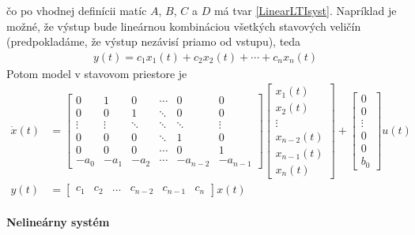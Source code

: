\documentclass[a4paper, 10pt, ]{article}
\begin{document}
čo po vhodnej definícii matíc $A$, $B$, $C$ a $D$ má tvar \eqref{LinearLTIsyst}. Napríklad je možné, že výstup bude lineárnou kombináciou všetkých stavových veličín (predpokladáme, že výstup nezávisí priamo od vstupu), teda
\begin{align}
	y(t) = c_1 x_1(t) + c_2 x_2(t) + \cdots + c_n x_n(t)
\end{align}
Potom model v stavovom priestore je
\begin{subequations}
\begin{align}
	\dot{x}(t)
	&
	=
	\begin{bmatrix}
  	0      & 1      & 0      & \cdots & 0      & 0      \\
   	0      & 0      & 1      & \ddots & 0      & 0      \\
    \vdots & \vdots & \ddots & \ddots & \ddots & \vdots \\
    0      & 0      & 0      & \ddots & 1      & 0      \\
    0      & 0      & 0      & \cdots & 0      & 1      \\
   	-a_0   & -a_1   & -a_2   & \cdots &-a_{n-2}&-a_{n-1}
	\end{bmatrix}
	\begin{bmatrix}
		x_1(t) \\ x_2(t) \\ \vdots \\ x_{n-2}(t) \\x_{n-1}(t)  \\ x_n(t)
	\end{bmatrix} +
	\begin{bmatrix}
		0 \\ 0 \\ \vdots \\ 0 \\0  \\ b_0
	\end{bmatrix}
	u(t)
\\
y(t) &= \begin{bmatrix}
		c_1& c_2 & \hdots & c_{n-2} & c_{n-1}  &c_n
	\end{bmatrix}
	x(t)
\end{align}
\end{subequations}





\paragraph{Nelineárny systém}
\end{document}

